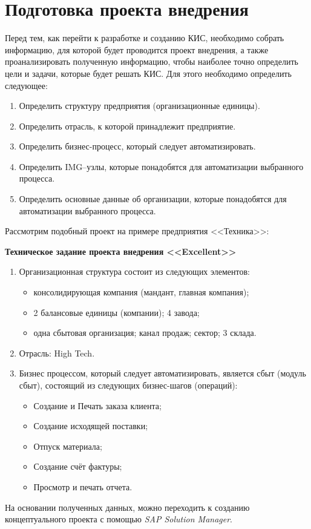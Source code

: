 \chapter{Подготовка проекта внедрения}

Перед тем, как перейти к разработке и созданию КИС, необходимо собрать
информацию, для которой будет проводится проект внедрения, а также проанализировать
полученную информацию, чтобы наиболее точно определить цели и задачи, которые будет
решать КИС. Для этого необходимо определить следующее:

\begin{enumerate}
\item Определить структуру предприятия (организационные единицы).
\item Определить отрасль, к которой принадлежит предприятие.
\item Определить бизнес-процесс, который следует автоматизировать.
\item Определить IMG–узлы, которые понадобятся для автоматизации выбранного процесса.
\item Определить основные данные об организации, которые понадобятся для автоматизации выбранного процесса.
\end{enumerate}

Рассмотрим подобный проект на примере предприятия <<Техника>>:

\textbf{Техническое задание проекта внедрения <<Excellent>>}
\begin{enumerate}
\item Организационная структура состоит из следующих элементов:
\begin{itemize}
    \item консолидирующая компания (мандант, главная компания);
    \item 2 балансовые единицы (компании); 4 завода;
    \item одна сбытовая организация; канал продаж; сектор; 3 склада.
\end{itemize}
\item Отрасль: High Tech.
\item Бизнес процессом, который следует автоматизировать, является сбыт (модуль сбыт), состоящий из следующих бизнес-шагов (операций):
\begin{itemize}
    \item Создание и Печать заказа клиента;
    \item Создание исходящей поставки;
    \item Отпуск материала;
    \item Создание счёт фактуры;
    \item Просмотр и печать отчета.
\end{itemize}
\end{enumerate}

На основании полученных данных, можно переходить к созданию концептуального проекта
с помощью \textit{SAP Solution Manager}.

